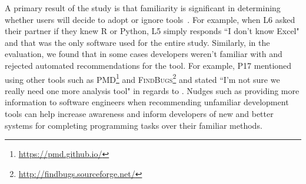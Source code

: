 A primary result of the \peer study is that familiarity is significant in determining whether users will decide to adopt or ignore tools~\cite{VLHCC}. For example, when L6 asked their partner if they knew R or Python, L5 simply responds ``I don't know Excel" and that was the only software used for the entire study. Similarly, in the \sorry evaluation, we found that in some cases developers weren't familiar with \EP and rejected automated recommendations for the tool. For example, P17 mentioned using other tools such as \textsc{PMD}\footnote{\url{https://pmd.github.io/}} and \textsc{FindBugs}\footnote{\url{http://findbugs.sourceforge.net/}} and stated ``I'm not sure we really need one more analysis tool" in regards to \EP. Nudges such as providing more information to software engineers when recommending unfamiliar development tools can help increase awareness and inform developers of new and better systems for completing programming tasks over their familiar methods.







